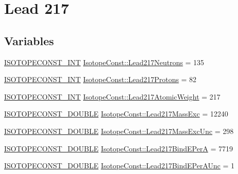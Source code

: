 \hypertarget{group___isotope_const-_lead-_pb217}{}\section{Lead 217}
\label{group___isotope_const-_lead-_pb217}
\subsection*{Variables}
\begin{DoxyCompactItemize}
\item 
\mbox{\hyperlink{group___isotope_const-_macros_ga5f18360b3e99483a35c32d789e62621c}{I\+S\+O\+T\+O\+P\+E\+C\+O\+N\+S\+T\+\_\+\+I\+NT}} \mbox{\hyperlink{group___isotope_const-_lead-_pb217_gafe412f2c06e92d44f93a5d2276e925a5}{Isotope\+Const\+::\+Lead217\+Neutrons}} = 135
\item 
\mbox{\hyperlink{group___isotope_const-_macros_ga5f18360b3e99483a35c32d789e62621c}{I\+S\+O\+T\+O\+P\+E\+C\+O\+N\+S\+T\+\_\+\+I\+NT}} \mbox{\hyperlink{group___isotope_const-_lead-_pb217_ga8af9bf22294479db86f2deee84226906}{Isotope\+Const\+::\+Lead217\+Protons}} = 82
\item 
\mbox{\hyperlink{group___isotope_const-_macros_ga5f18360b3e99483a35c32d789e62621c}{I\+S\+O\+T\+O\+P\+E\+C\+O\+N\+S\+T\+\_\+\+I\+NT}} \mbox{\hyperlink{group___isotope_const-_lead-_pb217_ga62302e2166c7826164afce005b6af80b}{Isotope\+Const\+::\+Lead217\+Atomic\+Weight}} = 217
\item 
\mbox{\hyperlink{group___isotope_const-_macros_ga8f45a7272ce02c0b4c65c44636ed719a}{I\+S\+O\+T\+O\+P\+E\+C\+O\+N\+S\+T\+\_\+\+D\+O\+U\+B\+LE}} \mbox{\hyperlink{group___isotope_const-_lead-_pb217_gab860eedaa3704a78c3c7ef777b53b041}{Isotope\+Const\+::\+Lead217\+Mass\+Exc}} = 12240
\item 
\mbox{\hyperlink{group___isotope_const-_macros_ga8f45a7272ce02c0b4c65c44636ed719a}{I\+S\+O\+T\+O\+P\+E\+C\+O\+N\+S\+T\+\_\+\+D\+O\+U\+B\+LE}} \mbox{\hyperlink{group___isotope_const-_lead-_pb217_gad2b0f2528ed0e4841201850c04decd08}{Isotope\+Const\+::\+Lead217\+Mass\+Exc\+Unc}} = 298
\item 
\mbox{\hyperlink{group___isotope_const-_macros_ga8f45a7272ce02c0b4c65c44636ed719a}{I\+S\+O\+T\+O\+P\+E\+C\+O\+N\+S\+T\+\_\+\+D\+O\+U\+B\+LE}} \mbox{\hyperlink{group___isotope_const-_lead-_pb217_gaf7bae0aeb6197550ed6366ed408909c7}{Isotope\+Const\+::\+Lead217\+Bind\+E\+PerA}} = 7719
\item 
\mbox{\hyperlink{group___isotope_const-_macros_ga8f45a7272ce02c0b4c65c44636ed719a}{I\+S\+O\+T\+O\+P\+E\+C\+O\+N\+S\+T\+\_\+\+D\+O\+U\+B\+LE}} \mbox{\hyperlink{group___isotope_const-_lead-_pb217_ga9a17acb7e9aeef68de6ab5605f7450f0}{Isotope\+Const\+::\+Lead217\+Bind\+E\+Per\+A\+Unc}} = 1

\end{DoxyCompactItemize}
